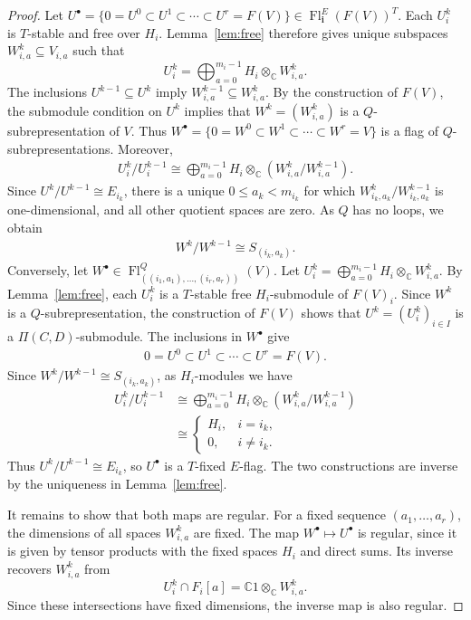 \documentclass[12pt,reqno]{amsart}
\numberwithin{equation}{section}
\theoremstyle{definition}
\theoremstyle{remark}
\newcommand{\Fl}{\operatorname{Fl}}
\theoremstyle{plain}
\theoremstyle{plain}
\begin{document}
\begin{proof}
Let $U^\bullet=\{0=U^0\subset U^1\subset\cdots\subset U^r=F(V)\} \in \Fl_{\mathbf i}^{E}(F(V))^T$. Each $U_i^k$ is $T$-stable and free over $H_i$. Lemma~\ref{lem:free} therefore gives unique subspaces $W_{i,a}^k\subseteq V_{i,a}$ such that
\[
    U_i^k=
    \bigoplus_{a=0}^{m_i-1}
    H_i\otimes_{\mathbb C}W_{i,a}^k.
\]
The inclusions $U^{k-1}\subseteq U^k$ imply $W_{i,a}^{k-1}\subseteq W_{i,a}^k$. By the construction of $F(V)$, the submodule condition on $U^k$ implies that $W^k=(W_{i,a}^k)$ is a $Q$-subrepresentation of $V$. Thus $W^\bullet=\{ 0=W^0\subset W^1\subset\cdots\subset W^r=V \}$ is a flag of $Q$-subrepresentations. Moreover,
\begin{align*}
    U_i^k/U_i^{k-1}
    \cong
    \bigoplus_{a=0}^{m_i-1}
    H_i\otimes_{\mathbb C}
    (W_{i,a}^k/W_{i,a}^{k-1}).
\end{align*}
Since $U^k/U^{k-1}\cong E_{i_k}$, there is a unique $0\le a_k<m_{i_k}$ for which $W_{i_k,a_k}^k/W_{i_k,a_k}^{k-1}$ is one-dimensional, and all other quotient spaces are zero. As $Q$ has no loops, we obtain
\begin{align*}
    W^k/W^{k-1}\cong S_{(i_k,a_k)}.
\end{align*}
Conversely, let $W^\bullet \in \Fl^{Q}_{((i_1,a_1),\ldots,(i_r,a_r))}(V)$. Let $U_i^k= \bigoplus_{a=0}^{m_i-1}H_i\otimes_{\mathbb C}W_{i,a}^k$.
By Lemma~\ref{lem:free}, each $U_i^k$ is a $T$-stable free $H_i$-submodule of $F(V)_i$. Since $W^k$ is a $Q$-subrepresentation, the construction of $F(V)$ shows that $U^k=(U_i^k)_{i\in I}$ is a $\Pi(C,D)$-submodule. The inclusions in $W^\bullet$ give
\begin{align*}
    0=U^0\subset U^1\subset\cdots\subset U^r=F(V).
\end{align*}
Since $W^k/W^{k-1}\cong S_{(i_k,a_k)}$, as $H_i$-modules we have
\[
\begin{aligned}
    U_i^k/U_i^{k-1}
    &\cong
    \bigoplus_{a=0}^{m_i-1}
    H_i\otimes_{\mathbb C}
    (W_{i,a}^k/W_{i,a}^{k-1})\\
    &\cong
    \begin{cases}
        H_i,&i=i_k,\\
        0,&i\ne i_k.
    \end{cases}
\end{aligned}
\]
Thus $U^k/U^{k-1}\cong E_{i_k}$, so $U^\bullet$ is a $T$-fixed $E$-flag. The two constructions are inverse by the uniqueness in Lemma~\ref{lem:free}.

It remains to show that both maps are regular.  For a fixed sequence $(a_1,\ldots,a_r)$, the dimensions of all spaces $W_{i,a}^k$ are fixed. The map $W^\bullet\mapsto U^\bullet$ is regular, since it is given by tensor products with the fixed spaces $H_i$ and direct sums.
Its inverse recovers $W_{i,a}^k$ from
\[
    U_i^k\cap F_i[a]
    =
    \mathbb C1\otimes_{\mathbb C}W_{i,a}^k.
\]
Since these intersections have fixed dimensions, the inverse map is also regular.


\end{proof}
\end{document}
